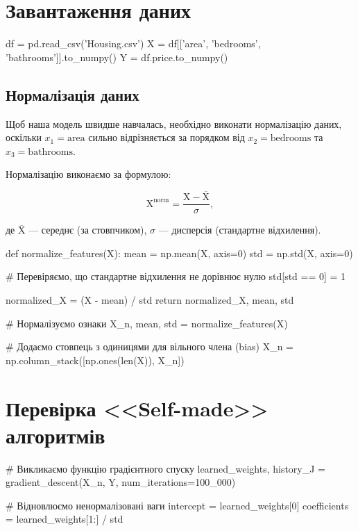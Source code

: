 \documentclass[]{article}
\newcounter{pythoncode}
\begin{document}
\section{Завантаження даних}

\begin{pythoncode}
df = pd.read_csv('Housing.csv')
X = df[['area', 'bedrooms', 'bathrooms']].to_numpy()
Y = df.price.to_numpy()
\end{pythoncode}

\subsection{Нормалізація даних}

Щоб наша модель швидше навчалась, необхідно виконати нормалізацію даних,
оскільки \(x_1 = \text{area}\) сильно відрізняється за порядком від
\(x_2 = \text{bedrooms}\) та \(x_3 = \text{bathrooms}\).

Нормалізацію виконаємо за формулою:

\[ \mathrm{X}^{\text{norm}} = \frac{\mathrm{X} - \overline{\mathrm{X}}}{\sigma}, \]

де \(\overline{\mathrm{X}}\) --- середнє (за стовпчиком), \(\sigma\) ---
дисперсія (стандартне відхилення).

\begin{pythoncode}
def normalize_features(X):
    mean = np.mean(X, axis=0)
    std = np.std(X, axis=0)

    # Перевіряємо, що стандартне відхилення не дорівнює нулю
    std[std == 0] = 1

    normalized_X = (X - mean) / std
    return normalized_X, mean, std
\end{pythoncode}



\begin{pythoncode}
# Нормалізуємо ознаки
X_n, mean, std = normalize_features(X)

# Додаємо стовпець з одиницями для вільного члена (bias)
X_n = np.column_stack([np.ones(len(X)), X_n])
\end{pythoncode}

\section{Перевірка <<Self-made>> алгоритмів}

\begin{pythoncode}
# Викликаємо функцію градієнтного спуску
learned_weights, history_J = gradient_descent(X_n, Y, num_iterations=100_000)

# Відновлюємо ненормалізовані ваги
intercept = learned_weights[0]
coefficients = learned_weights[1:] / std
\end{pythoncode}
\end{document}
